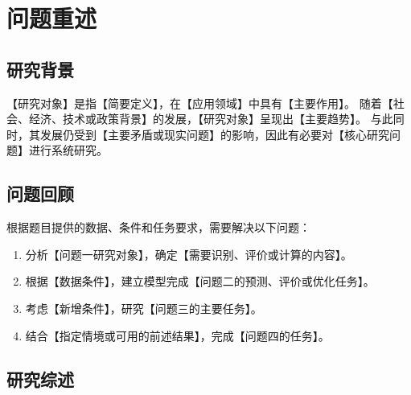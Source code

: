 \documentclass[withoutpreface,bwprint]{cumcmthesis}
\begin{document}

\vspace{-1.4cm}

\section{问题重述}

\subsection{研究背景}

【研究对象】是指【简要定义】，在【应用领域】中具有【主要作用】。
随着【社会、经济、技术或政策背景】的发展，【研究对象】呈现出【主要趋势】。
与此同时，其发展仍受到【主要矛盾或现实问题】的影响，因此有必要对【核心研究问题】进行系统研究。

\subsection{问题回顾}

根据题目提供的数据、条件和任务要求，需要解决以下问题：

\begin{enumerate}
	\item 分析【问题一研究对象】，确定【需要识别、评价或计算的内容】。
	\item 根据【数据条件】，建立模型完成【问题二的预测、评价或优化任务】。
	\item 考虑【新增条件】，研究【问题三的主要任务】。
	\item 结合【指定情境或可用的前述结果】，完成【问题四的任务】。
\end{enumerate}

\subsection{研究综述}
\end{document}
